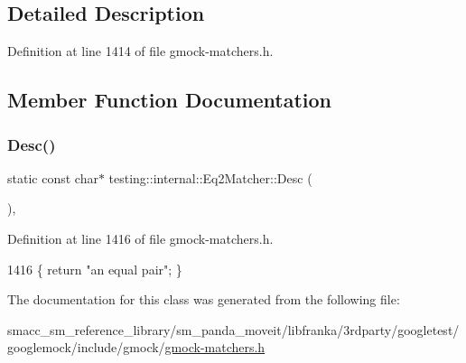 \subsection{Detailed Description}


Definition at line 1414 of file gmock-\/matchers.\+h.



\subsection{Member Function Documentation}
\mbox{\label{classtesting_1_1internal_1_1Eq2Matcher_a87c049778ac3d124641b21e47ef558dc}} 
\subsubsection{\texorpdfstring{Desc()}{Desc()}}
{\footnotesize\ttfamily static const char$\ast$ testing\+::internal\+::\+Eq2\+Matcher\+::\+Desc (\begin{DoxyParamCaption}{ }\end{DoxyParamCaption})\hspace{0.3cm}{\ttfamily [inline]}, {\ttfamily [static]}}



Definition at line 1416 of file gmock-\/matchers.\+h.


\begin{DoxyCode}
1416 \{ \textcolor{keywordflow}{return} \textcolor{stringliteral}{"an equal pair"}; \}
\end{DoxyCode}


The documentation for this class was generated from the following file\+:\begin{DoxyCompactItemize}
\item 
smacc\+\_\+sm\+\_\+reference\+\_\+library/sm\+\_\+panda\+\_\+moveit/libfranka/3rdparty/googletest/googlemock/include/gmock/\hyperlink{gmock-matchers_8h}{gmock-\/matchers.\+h}\end{DoxyCompactItemize}

